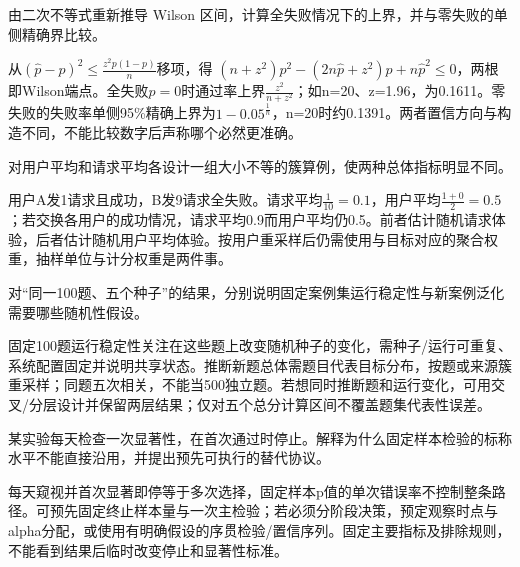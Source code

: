 \begin{exercises}
\begin{exercise} 由二次不等式重新推导 Wilson 区间，计算全失败情况下的上界，并与零失败的单侧精确界比较。

\begin{solution}
从$(\hat p-p)^2\le \frac{z^2p(1-p)}{n}$移项，得 $(n+z^2)p^2-(2n\hat p+z^2)p+n\hat p^2\le0$，两根即Wilson端点。全失败$\hat p=0$时通过率上界$\frac{z^2}{n+z^2}$；如n=20、z=1.96，为0.1611。零失败的失败率单侧95\%精确上界为$1-0.05^{\frac{1}{n}}$，n=20时约0.1391。两者置信方向与构造不同，不能比较数字后声称哪个必然更准确。
\end{solution}
\end{exercise}

\begin{exercise}\optional 对用户平均和请求平均各设计一组大小不等的簇算例，使两种总体指标明显不同。

\begin{solution}
用户A发1请求且成功，B发9请求全失败。请求平均$\frac{1}{10}=0.1$，用户平均$\frac{1+0}{2}=0.5$；若交换各用户的成功情况，请求平均0.9而用户平均仍0.5。前者估计随机请求体验，后者估计随机用户平均体验。按用户重采样后仍需使用与目标对应的聚合权重，抽样单位与计分权重是两件事。
\end{solution}
\end{exercise}

\begin{exercise} 对“同一100题、五个种子”的结果，分别说明固定案例集运行稳定性与新案例泛化需要哪些随机性假设。

\begin{solution}
固定100题运行稳定性关注在这些题上改变随机种子的变化，需种子/运行可重复、系统配置固定并说明共享状态。推断新题总体需题目代表目标分布，按题或来源簇重采样；同题五次相关，不能当500独立题。若想同时推断题和运行变化，可用交叉/分层设计并保留两层结果；仅对五个总分计算区间不覆盖题集代表性误差。
\end{solution}
\end{exercise}

\begin{exercise}\optional 某实验每天检查一次显著性，在首次通过时停止。解释为什么固定样本检验的标称水平不能直接沿用，并提出预先可执行的替代协议。

\begin{solution}
每天窥视并首次显著即停等于多次选择，固定样本p值的单次错误率不控制整条路径。可预先固定终止样本量与一次主检验；若必须分阶段决策，预定观察时点与alpha分配，或使用有明确假设的序贯检验/置信序列。固定主要指标及排除规则，不能看到结果后临时改变停止和显著性标准。
\end{solution}
\end{exercise}


\end{exercises}
